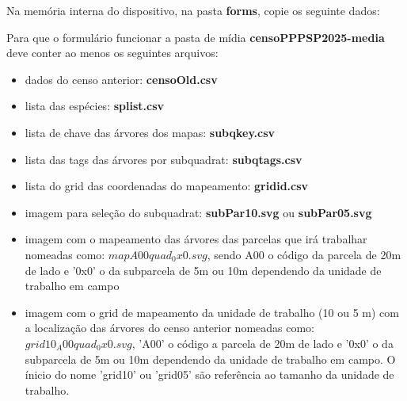 
Na memória interna do dispositivo, na pasta  \textbf{forms}, copie os seguinte dados:

\begin{center}
\end{center}



Para que o formulário funcionar a pasta de mídia \textbf{censoPPPSP2025-media} deve conter ao menos os seguintes arquivos:
\begin{itemize}
\item dados do censo anterior: \textbf{censoOld.csv} 
\item lista das espécies: \textbf{splist.csv}
\item lista de chave das árvores dos mapas: \textbf{subqkey.csv}
\item lista das tags das árvores por subquadrat: \textbf{subqtags.csv}
\item lista do grid das coordenadas do mapeamento: \textbf{gridid.csv}
\item imagem para seleção do subquadrat: \textbf{subPar10.svg} ou \textbf{subPar05.svg}
\item imagem com o mapeamento das árvores das parcelas que irá trabalhar nomeadas como: \textbf{$mapA00quad_0x0.svg$}, sendo A00 o código da parcela de 20m de lado e '0x0' o da subparcela de 5m ou 10m dependendo da unidade de trabalho em campo
\item imagem com o grid de mapeamento da unidade de trabalho (10 ou 5 m) com a localização das árvores do censo anterior nomeadas como: \textbf{$grid10_A00quad_0x0.svg$}, 'A00' o código a parcela de 20m de lado e '0x0' o da subparcela de 5m ou 10m dependendo da unidade de trabalho em campo. O ínicio do nome 'grid10' ou 'grid05' são referência ao tamanho da unidade de trabalho.
\end{itemize}

